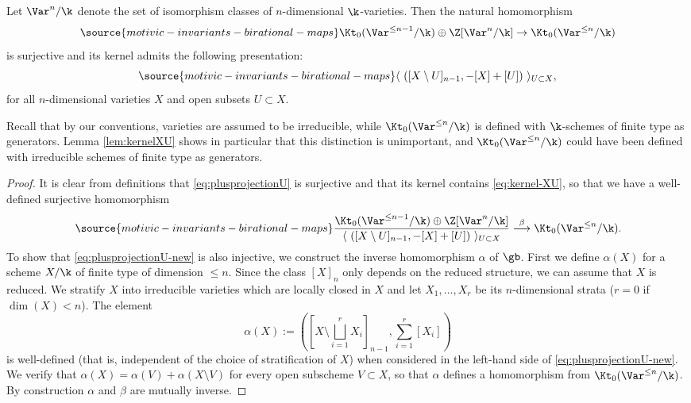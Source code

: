 \begin{lemma}
\notready\label{lem:kernelXU}
Let $\Var^n/\k$ denote the set of isomorphism
classes of $n$-dimensional $\k$-varieties.
Then the natural homomorphism
\begin{equation}\label{eq:plusprojectionU}
\source{motivic-invariants-birational-maps}
\Kt_0(\Var^{\le n-1}/\k) \oplus \Z[\Var^n/\k] \to \Kt_0(\Var^{\le n}/\k)
\end{equation}
is surjective and its kernel
admits the following presentation:
\begin{equation}\label{eq:kernel-XU}
\source{motivic-invariants-birational-maps}
\langle \ \left( [X \setminus U]_{n-1},
- [X] + [U] \right) \ \rangle_{U \subset X},
\end{equation}
for all $n$-dimensional
varieties $X$
and open subsets $U \subset X$.
\end{lemma}

Recall that by our conventions, varieties are assumed
to be irreducible, while
$\Kt_0(\Var^{\le n}/\k)$
is defined with $\k$-schemes of finite type as generators. Lemma
\ref{lem:kernelXU} shows in particular that this distinction
is unimportant, and $\Kt_0(\Var^{\le n}/\k)$
could have been defined with irreducible schemes
of finite type as generators.

\begin{proof}
It is clear from definitions that
\eqref{eq:plusprojectionU}
is surjective and that
its kernel contains
\eqref{eq:kernel-XU},
so that we have a well-defined surjective homomorphism
\begin{equation}\label{eq:plusprojectionU-new}
\source{motivic-invariants-birational-maps}
\frac{\Kt_0(\Var^{\le n-1}/\k) \oplus \Z[\Var^n/\k]}{\langle \ \left( [X \setminus U]_{n-1},
- [X] + [U] \right) \ \rangle_{U \subset X}}
\overset{\beta}\longrightarrow
\Kt_0(\Var^{\le n}/\k).
\end{equation}
To show that \eqref{eq:plusprojectionU-new} is also
injective,
we construct the inverse homomorphism $\alpha$ of $\gb$.
First we define $\alpha(X)$ for a scheme $X/\k$
of finite type of dimension $\le n$.
Since the class $[X]_n$ only depends on the reduced structure,
we can assume that $X$ is reduced.
We stratify $X$ into
irreducible varieties which are locally closed in $X$ and
let $X_1, \dots, X_r$
be its $n$-dimensional strata
($r = 0$ if $\dim(X) < n$).
The element
\[
\alpha(X) :=
\left([X \setminus \bigsqcup_{i=1}^r X_i ]_{n-1}, \sum_{i=1}^r [X_i]\right)
\]
is well-defined
(that is, independent of the choice of stratification of $X$)
when
considered in the left-hand side of \eqref{eq:plusprojectionU-new}.
We verify that
$\alpha(X) = \alpha(V) + \alpha(X\setminus V)$
for every open subscheme $V \subset X$, so
that $\alpha$ defines a homomorphism
from $\Kt_0(\Var^{\le n}/\k)$.
By construction $\alpha$ and $\beta$ are mutually inverse.
\end{proof}




